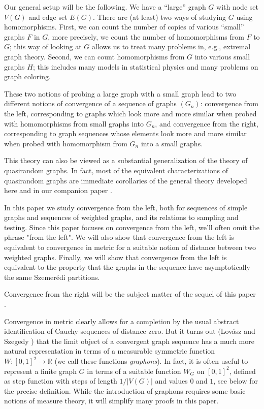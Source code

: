 \documentclass[12pt]{article}
\numberwithin{equation}{section}
\def\R{{\mathbb R}}
\begin{document}
Our general setup will be the following. We have a ``large'' graph
$G$ with node set $V(G)$ and edge set $E(G)$. There are (at least)
two ways of studying $G$ using homomorphisms. First, we can count the
number of copies of various ``small'' graphs $F$ in $G$, more
precisely, we count the number of homomorphisms from $F$ to $G$; this
way of looking at $G$ allows us to treat many problems in, {e.g.,}
extremal graph theory. Second, we can count homomorphisms from
$G$ into various small graphs $H$; this includes
many models in
statistical physics and many problems on graph coloring.

These two notions of probing a large graph with a small graph lead
to two different notions of convergence of a sequence of graphs
$(G_n)$: convergence from the left, corresponding to graphs which
look more and more similar when probed with homomorphisms from small
graphs into $G_n$, and convergence from the right, corresponding to
graph sequences whose elements look more and more similar when
probed with homomorphism from $G_n$ into a small graphs.

This theory can also be viewed as a substantial generalization of the
theory of quasirandom graphs. In fact, most of the equivalent
characterizations of quasirandom graphs are immediate corollaries of
the general theory developed here and in our companion paper
\cite{dense2}.

In this paper we study convergence from the left, both for sequences
of simple graphs and sequences of weighted graphs, and its relations
to sampling and testing.  {Since this paper focuses on convergence
from the left, we'll often omit the phrase "from the left".} We will
also show that convergence from the left is equivalent to convergence
in metric for a suitable
notion of distance between two weighted graphs. Finally, we
will show that convergence from the left is equivalent to the
property that the graphs in the sequence have asymptotically the same
Szemer\'edi partitions.

Convergence from the right will be the subject matter of the sequel
of this paper \cite{dense2}.

Convergence in metric clearly allows for a completion by the usual
abstract identification of Cauchy sequences of distance zero.  But it
turns out (Lov\'asz and Szegedy \cite{LSz1}) that the limit
object of a convergent graph sequence has a much more natural
representation in terms of a measurable symmetric function
$W:[0,1]^2\to\R$ (we call these functions {\it graphons}). In
fact, it is often useful to represent a finite graph $G$ in terms of
a suitable function $W_G$ on $[0,1]^2$, defined as step
function with steps of length $1/|V(G)|$ and
values $0$ and $1$, see below for the precise definition.
While the introduction of graphons requires some basic notions of
measure theory, it will simplify many proofs in this paper.
\end{document}
